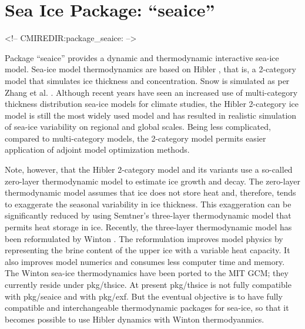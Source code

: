 


\section{Sea Ice Package: ``seaice''}
\label{sec:pkg:seaice}
\begin{rawhtml}
<!-- CMIREDIR:package_seaice: -->
\end{rawhtml}

Package ``seaice'' provides a dynamic and thermodynamic interactive
sea-ice model.  Sea-ice model thermodynamics are based on Hibler
\cite{hib80}, that is, a 2-category model that simulates ice thickness
and concentration.  Snow is simulated as per Zhang et al.
\cite{zha98a}.  Although recent years have seen an increased use of
multi-category thickness distribution sea-ice models for climate
studies, the Hibler 2-category ice model is still the most widely used
model and has resulted in realistic simulation of sea-ice variability
on regional and global scales.  Being less complicated, compared to
multi-category models, the 2-category model permits easier application
of adjoint model optimization methods.

Note, however, that the Hibler 2-category model and its variants use a
so-called zero-layer thermodynamic model to estimate ice growth and
decay.  The zero-layer thermodynamic model assumes that ice does not
store heat and, therefore, tends to exaggerate the seasonal
variability in ice thickness.  This exaggeration can be significantly
reduced by using Semtner's \cite{sem76} three-layer thermodynamic
model that permits heat storage in ice.  Recently, the three-layer
thermodynamic model has been reformulated by Winton \cite{win00}.  The
reformulation improves model physics by representing the brine content
of the upper ice with a variable heat capacity.  It also improves
model numerics and consumes less computer time and memory.  The Winton
sea-ice thermodynamics have been ported to the MIT GCM; they currently
reside under pkg/thsice.  At present pkg/thsice is not fully
compatible with pkg/seaice and with pkg/exf.  But the eventual
objective is to have fully compatible and interchangeable
thermodynamic packages for sea-ice, so that it becomes possible to use
Hibler dynamics with Winton thermodyanmics.

